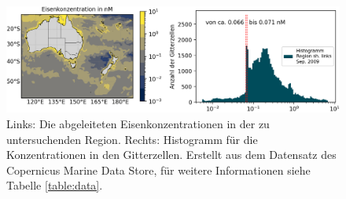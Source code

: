 \documentclass[12pt,a4paper,onecolumn,headheight=30pt]{scrartcl}
\begin{document}
\begin{figure}[htbp]
\includegraphics[width=\textwidth]{bilder/nutrient_iron.png}
\caption{Links: Die abgeleiteten Eisenkonzentrationen in der zu untersuchenden Region. Rechts: Histogramm für die Konzentrationen in den Gitterzellen. Erstellt aus dem Datensatz des Copernicus Marine Data Store, für weitere Informationen siehe Tabelle \ref{table:data}.} \label{fig:nutrient_iron}
\end{figure}
\end{document}
